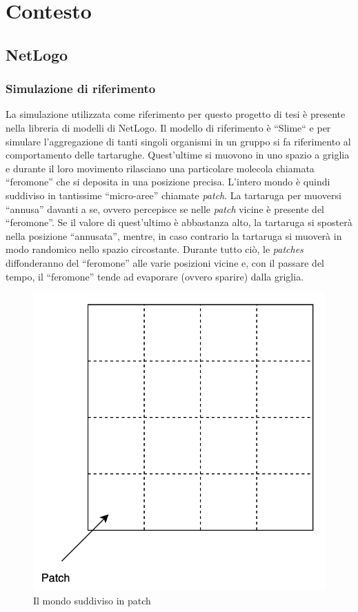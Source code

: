 \chapter{Contesto}
\section{NetLogo}

\subsection{Simulazione di riferimento}\label{refSim}
La simulazione utilizzata come riferimento per questo progetto di tesi è presente nella libreria
di modelli di NetLogo\space\cite{wilensky1997netlogo}. Il modello di riferimento è ``Slime``\space\cite{wilensky1997netlogo}
e per simulare l'aggregazione di tanti singoli organismi in un gruppo si fa riferimento al comportamento delle tartarughe.
Quest'ultime si muovono in uno spazio a griglia e durante il loro movimento rilasciano una particolare molecola
chiamata ``feromone'' che si deposita in una posizione precisa. L'intero mondo è quindi suddiviso
in tantissime ``micro-aree'' chiamate \textit{patch}. La tartaruga per muoversi 
``annusa'' davanti a se, ovvero percepisce se nelle \textit{patch} vicine è presente del ``feromone''. Se il valore di quest'ultimo è abbastanza alto, la 
tartaruga si sposterà nella posizione ``annusata'', mentre, in caso contrario la tartaruga si muoverà in modo randomico nello spazio circostante. 
Durante tutto ciò, le \textit{patches} diffonderanno del ``feromone'' alle varie posizioni vicine e, con il passare del tempo,
il ``feromone'' tende ad evaporare (ovvero sparire) dalla griglia.
\begin{figure}[ht]
    \centering
    \includegraphics[width=.6\linewidth]{figures/patch.png}
    \caption{Il mondo suddiviso in patch}\label{fig:patch}
\end{figure}

